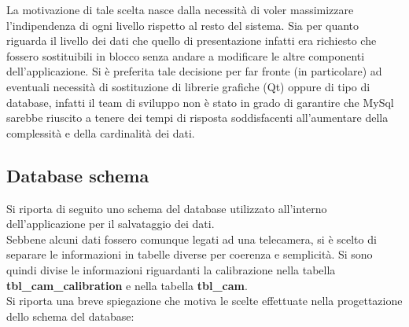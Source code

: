 \documentclass[a4paper,13pt,twoside]{article}
\begin{document}
La motivazione di tale scelta nasce dalla necessità di voler massimizzare l'indipendenza di ogni livello rispetto al resto del sistema. Sia per quanto riguarda il livello dei dati che quello di presentazione infatti era richiesto che fossero sostituibili in blocco senza andare a modificare le altre componenti dell'applicazione. Si è preferita tale decisione per far fronte (in particolare) ad eventuali necessità di sostituzione di librerie grafiche (Qt) oppure di tipo di database, infatti il team di sviluppo non è stato in grado di garantire che MySql sarebbe riuscito a tenere dei tempi di risposta soddisfacenti all'aumentare della complessità e della cardinalità dei dati.

\subsection{Database schema} \label{sec:dbschema}
Si riporta di seguito uno schema del database utilizzato all'interno dell'applicazione per il salvataggio dei dati. \\
Sebbene alcuni dati fossero comunque legati ad una telecamera, si è scelto di separare le informazioni in tabelle diverse per coerenza e semplicità. Si sono quindi divise le informazioni riguardanti la calibrazione nella tabella \textbf{tbl_cam_calibration} e nella tabella \textbf{tbl_cam}.\\
Si riporta una breve spiegazione che motiva le scelte effettuate nella progettazione dello schema del database:
\end{document}
